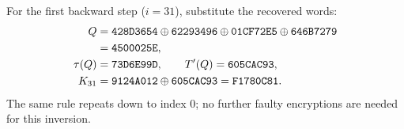 For the first backward step ($i=31$), substitute the recovered words:
\begin{align*}
Q&=\texttt{428D3654}\mathbin{\oplus}\texttt{62293496}\mathbin{\oplus}\texttt{01CF72E5}\mathbin{\oplus}\texttt{646B7279}\\
&=\texttt{4500025E},\\
\tau(Q)&=\texttt{73D6E99D},\qquad T'(Q)=\texttt{605CAC93},\\
K_{31}&=\texttt{9124A012}\mathbin{\oplus}\texttt{605CAC93}=\texttt{F1780C81}.\end{align*}
The same rule repeats down to index 0; no further faulty encryptions are needed for this inversion.
